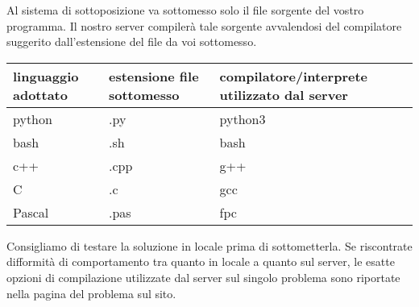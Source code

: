 Al sistema di sottoposizione va sottomesso solo il file sorgente del vostro programma. Il nostro server compiler\`a tale sorgente avvalendosi del compilatore
suggerito dall'estensione del file da voi sottomesso.

\vspace{0.2cm}
\begin{tabular}{|l|l|l|}
\hline
  linguaggio adottato  & estensione file sottomesso & compilatore/interprete utilizzato dal server  \\ \hline
\hline               
  python  & .py  & python3 \\ \hline
  bash    & .sh  & bash \\ \hline
  c++     & .cpp & g++ \\ \hline
  C       & .c   & gcc \\ \hline
  Pascal  & .pas & fpc \\ \hline
\hline               
\end{tabular}

\vspace{0.2cm}
Consigliamo di testare la soluzione in locale prima di sottometterla.
Se riscontrate difformit\`a di comportamento tra quanto in locale a quanto sul server, le esatte opzioni di compilazione utilizzate dal server sul singolo problema sono riportate nella pagina del problema sul sito.
